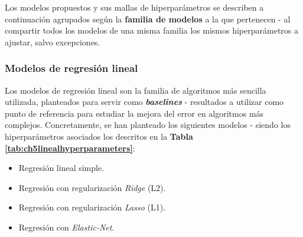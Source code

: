 Los modelos propuestos y sus mallas de hiperparámetros se describen a continuación agrupados según la \textbf{familia de modelos} a la que pertenecen - al compartir todos los modelos de una misma familia los mismos hiperparámetros a ajustar, salvo excepciones.

\subsubsection{Modelos de regresión lineal}

Los modelos de regresión lineal son la familia de algoritmos más sencilla utilizada, planteados para servir como \textbf{\textit{baselines}} - resultados a utilizar como punto de referencia para estudiar la mejora del error en algoritmos más complejos. Concretamente, se han planteado los siguientes modelos - siendo los hiperparámetros asociados los descritos en la \textbf{Tabla \ref{tab:ch5linealhyperparameters}}:

\begin{itemize}[parsep=1pt, itemsep=0pt, topsep=1pt]
	\item Regresión lineal simple.
	\item Regresión con regularización \textit{Ridge} (L2).
	\item Regresión con regularización \textit{Lasso} (L1).
	\item Regresión con \textit{Elastic-Net}.
\end{itemize}

